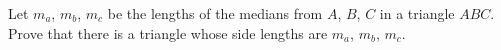 Let $m_a$, $m_b$, $m_c$ be the lengths of the medians from $A$, $B$, $C$ in a triangle $ABC$. Prove that there is a triangle whose side lengths are $m_a$, $m_b$, $m_c$.
